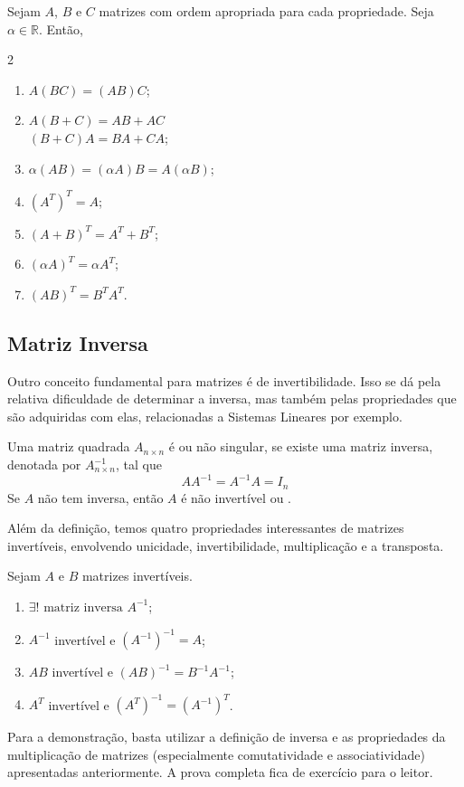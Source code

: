 \documentclass[../main.tex]{subfiles}
\begin{document}
		\begin{teorema}
			Sejam $A$, $B$ e $C$ matrizes com ordem apropriada para cada propriedade. Seja $\alpha\in \mathbb{R}$. Então,
			\begin{multicols}{2}
				\begin{enumerate}[label=\roman*)]
					\item $A(BC)=(AB)C$;
					\item $A(B+C)=AB+AC$ \\ $(B+C)A=BA+CA$;
					\item $\alpha(AB)=(\alpha A)B=A(\alpha B)$;
					\item $(A^T)^T=A$;
					\item $(A+B)^T=A^T+B^T$;
					\item $(\alpha A)^T=\alpha A^T$;
					\item $(AB)^T=B^TA^T$.
				\end{enumerate}
			\end{multicols}
		\end{teorema}

		
		\subsection{Matriz Inversa}
			Outro conceito fundamental para matrizes é de invertibilidade. Isso se dá pela relativa dificuldade de determinar a inversa, mas também pelas propriedades que são adquiridas com elas, relacionadas a Sistemas Lineares por exemplo.
			\begin{definicao}
				Uma matriz quadrada $A_{n\times n}$ é  ou não singular, se existe uma matriz inversa, denotada por $A^{-1}_{n\times n}$, tal que
				\[
				AA^{-1}=A^{-1}A=I_n
				\]
				Se $A$ não tem inversa, então $A$ é não invertível ou \azul{singular}.
			\end{definicao}
			Além da definição, temos quatro propriedades interessantes de matrizes invertíveis, envolvendo unicidade, invertibilidade, multiplicação e a transposta.
			\begin{teorema}
				Sejam $A$ e $B$ matrizes invertíveis.
				\begin{enumerate}[label=\roman*)]
					\item $\exists! \text{ matriz inversa } A^{-1}$;
					\item $A^{-1}$ invertível e $(A^{-1})^{-1}=A$;
					\item $AB$ invertível e $(AB)^{-1}=B^{-1}A^{-1}$;
					\item $A^T$ invertível e $(A^T)^{-1}=(A^{-1})^T$.
				\end{enumerate}
			\end{teorema}
			Para a demonstração, basta utilizar a definição de inversa e as propriedades da multiplicação de matrizes (especialmente comutatividade e associatividade) apresentadas anteriormente. A prova completa fica de exercício para o leitor.
			 
\end{document}
